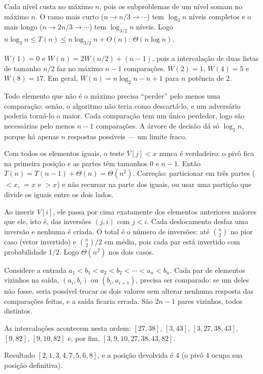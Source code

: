  Cada nível custa no máximo $n$, pois os subproblemas de um nível somam no máximo $n$. O ramo mais curto ($n\to n/3\to\cdots$) tem $\log_3n$ níveis completos e o mais longo ($n\to2n/3\to\cdots$) tem $\log_{3/2}n$ níveis. Logo $n\log_3n\le T(n)\le n\log_{3/2}n+O(n)$: $\Theta(n\log n)$.

 $W(1)=0$ e $W(n)=2W(n/2)+(n-1)$, pois a intercalação de duas listas de tamanho $n/2$ faz no máximo $n-1$ comparações. $W(2)=1$, $W(4)=5$ e $W(8)=17$. Em geral, $W(n)=n\log_2n-n+1$ para $n$ potência de 2.

 Todo elemento que não é o máximo precisa ``perder'' pelo menos uma comparação; senão, o algoritmo não teria como descartá-lo, e um adversário poderia torná-lo o maior. Cada comparação tem um único perdedor, logo são necessárias pelo menos $n-1$ comparações. A árvore de decisão dá só $\log_2n$, porque há apenas $n$ respostas possíveis --- um limite fraco.

 Com todos os elementos iguais, o teste $V[j]<x$ nunca é verdadeiro: o pivô fica na primeira posição e as partes têm tamanhos $0$ e $n-1$. Então $T(n)=T(n-1)+\Theta(n)=\Theta(n^2)$. Correção: particionar em três partes ($<x$, $=x$ e $>x$) e não recursar na parte dos iguais, ou usar uma partição que divide os iguais entre os dois lados.

 Ao inserir $V[i]$, ele passa por cima exatamente dos elementos anteriores maiores que ele, isto é, das inversões $(j,i)$ com $j<i$. Cada deslocamento desfaz uma inversão e nenhuma é criada. O total é o número de inversões: até $\binom n2$ no pior caso (vetor invertido) e $\binom n2/2$ em média, pois cada par está invertido com probabilidade $1/2$. Logo $\Theta(n^2)$ nos dois casos.

 Considere a entrada $a_1<b_1<a_2<b_2<\cdots<a_n<b_n$. Cada par de elementos vizinhos na saída, $(a_i,b_i)$ ou $(b_i,a_{i+1})$, precisa ser comparado: se um deles não fosse, seria possível trocar os dois valores sem alterar nenhuma resposta das comparações feitas, e a saída ficaria errada. São $2n-1$ pares vizinhos, todos distintos.

 As intercalações acontecem nesta ordem: $[27,38]$, $[3,43]$, $[3,27,38,43]$, $[9,82]$, $[9,10,82]$ e, por fim, $[3,9,10,27,38,43,82]$.

 Resultado $[2,1,3,4,7,5,6,8]$, e a posição devolvida é 4 (o pivô 4 ocupa sua posição definitiva).

